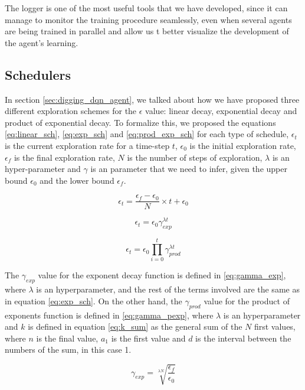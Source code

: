 The logger is one of the most useful tools that we have developed, since it can manage to monitor the training procedure seamlessly, even when several agents are being trained in parallel and allow us t better visualize the development of the agent's learning. 

\subsection{Schedulers}
In section \ref{sec:digging_dqn_agent}, we talked about how we have proposed three different exploration schemes for the $\epsilon$ value: linear decay, exponential decay and product of exponential decay. To formalize this, we proposed the equations \ref{eq:linear_sch}, \ref{eq:exp_sch} and \ref{eq:prod_exp_sch} for each type of schedule, $\epsilon_t$ is the current exploration rate for a time-step $t$,  $\epsilon_0$ is the initial exploration rate, $\epsilon_f$ is the final exploration rate, $N$ is the number of steps of exploration, $\lambda$ is an hyper-parameter and $\gamma$ is an parameter that we need to infer, given the upper bound $\epsilon_0$ and the lower bound $\epsilon_f$. 

\begin{equation}
	\label{eq:linear_sch}
	\epsilon_t = \frac{\epsilon_f - \epsilon_0}{N} \times t + \epsilon_0
\end{equation}

\begin{equation}
	\label{eq:exp_sch}
	\epsilon_t = \epsilon_0 \gamma_{exp}^{\lambda t}
\end{equation}

\begin{equation}
	\label{eq:prod_exp_sch}
	\epsilon_t = \epsilon_0 \prod_{i=0}^{t} \gamma_{prod}^{\lambda t}
\end{equation}

The $\gamma_{exp}$ value for the exponent decay function is defined in \ref{eq:gamma_exp}, where $\lambda$ is an hyperparameter, and the rest of the terms involved are the same as in equation \ref{eq:exp_sch}. On the other hand, the $\gamma_{prod}$ value for the product of exponents function is defined in  \ref{eq:gamma_pexp}, where $\lambda$ is an hyperparameter and $k$ is defined in equation \ref{eq:k_sum} as the general sum of the $N$ first values, where $n$ is the final value, $a_1$ is the first value and $d$ is the interval between the numbers of the sum, in this case 1.

\begin{equation}
	\label{eq:gamma_exp}
	\gamma_{exp} = \sqrt[\lambda N]{\frac{\epsilon_f}{\epsilon_0}}
\end{equation}

